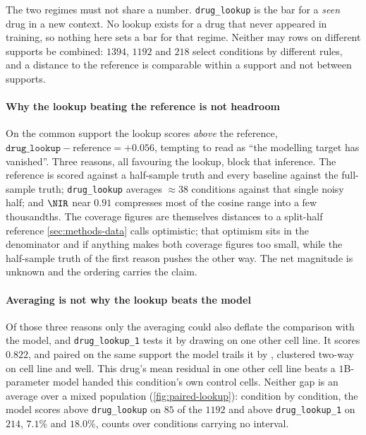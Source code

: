 \begin{scopelimit}
The two regimes must not share a number. \texttt{drug\_lookup} is the bar for a
\emph{seen} drug in a new context. No lookup exists for a drug that never
appeared in training, so nothing here sets a bar for that regime. Neither may
rows on different supports be combined: $\num{1394}$, $\num{1192}$ and
$\num{218}$ select conditions by different rules, and a distance to the reference
is comparable within a support and not between supports.
\end{scopelimit}

\paragraph{Why the lookup beating the reference is not headroom} On the common
support the lookup scores \emph{above} the reference,
$\texttt{drug\_lookup} - \textrm{reference} = +0.056$, tempting to read as ``the
modelling target has vanished''. Three reasons, all favouring the lookup, block
that inference. The reference is scored against a half-sample truth and every
baseline against the full-sample truth; \texttt{drug\_lookup} averages
$\approx 38$ conditions against that single noisy half; and $\NIR$ near $0.91$
compresses most of the cosine range into a few thousandths. The coverage figures
are themselves distances to a split-half reference \cref{sec:methods-data} calls
optimistic; that optimism sits in the denominator and if anything makes both
coverage figures too small, while the half-sample truth of the first reason
pushes the other way. The net magnitude is unknown and the ordering carries the
claim.

\paragraph{Averaging is not why the lookup beats the model} Of those three
reasons only the averaging could also deflate the comparison with the model, and
\texttt{drug\_lookup\_1} tests it by drawing on one other cell line. It scores
$0.822$, and paired on the same support the model trails it by
, clustered two-way on cell line and well. This
drug's mean residual in one other cell line beats a $1$B-parameter model handed
this condition's own control cells. Neither gap is an average over a mixed
population (\cref{fig:paired-lookup}): condition by condition, the model scores
above \texttt{drug\_lookup} on $85$ of the $\num{1192}$ and above
\texttt{drug\_lookup\_1} on $214$, $7.1\%$ and $18.0\%$, counts over conditions
carrying no interval.

